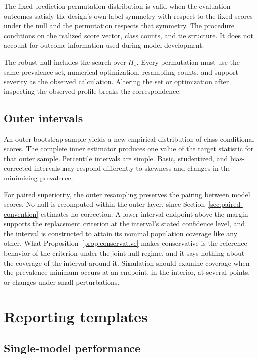 \documentclass[11pt]{article}
\newcommand{\PSet}{\Pi_\star}
\theoremstyle{remark}
\begin{document}
The fixed-prediction permutation distribution is valid when the evaluation outcomes satisfy the design's own label symmetry with respect to the fixed scores under the null and the permutation respects that symmetry. The procedure conditions on the realized score vector, class counts, and tie structure. It does not account for outcome information used during model development.

The robust null includes the search over $\PSet$. Every permutation must use the same prevalence set, numerical optimization, resampling counts, and support severity as the observed calculation. Altering the set or optimization after inspecting the observed profile breaks the correspondence.

\subsection{Outer intervals}

An outer bootstrap sample yields a new empirical distribution of class-conditional scores. The complete inner estimator produces one value of the target statistic for that outer sample. Percentile intervals are simple. Basic, studentized, and bias-corrected intervals may respond differently to skewness and changes in the minimizing prevalence.

For paired superiority, the outer resampling preserves the pairing between model scores. No null is recomputed within the outer layer, since Section~\ref{sec:paired-convention} estimates no correction. A lower interval endpoint above the margin supports the replacement criterion at the interval's stated confidence level, and the interval is constructed to attain its nominal population coverage like any other. What Proposition~\ref{prop:conservative} makes conservative is the reference behavior of the criterion under the joint-null regime, and it says nothing about the coverage of the interval around it. Simulation should examine coverage when the prevalence minimum occurs at an endpoint, in the interior, at several points, or changes under small perturbations.

\section{Reporting templates}
\label{app:report-template}

\subsection{Single-model performance}
\end{document}

